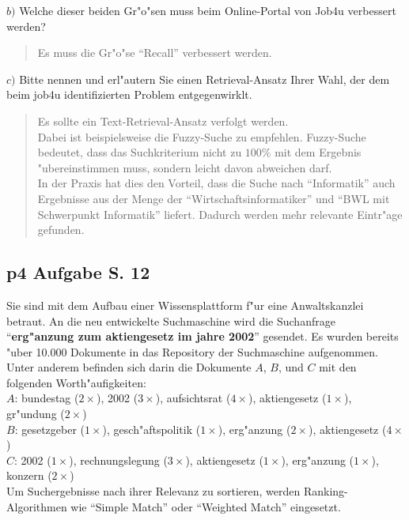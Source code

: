 \noindent
$b)$ Welche dieser beiden Gr"o"sen muss beim Online-Portal von Job4u verbessert werden?\\
\begin{quote}
    Es muss die Gr"o"se "`Recall"' verbessert werden.
\end{quote}

\noindent
$c)$ Bitte nennen und erl"autern Sie einen Retrieval-Ansatz Ihrer Wahl, der dem beim job4u identifizierten Problem entgegenwirklt.\\
\begin{quote}
    Es sollte ein Text-Retrieval-Ansatz verfolgt werden.\\
    Dabei ist beispielsweise die Fuzzy-Suche zu empfehlen.
    Fuzzy-Suche bedeutet, dass das Suchkriterium nicht zu $100\%$ mit dem Ergebnis "ubereinstimmen muss, sondern leicht davon abweichen darf.\\
    In der Praxis hat dies den Vorteil, dass die Suche nach "`Informatik"' auch Ergebnisse aus der Menge der "`Wirtschaftsinformatiker"' und "`BWL mit Schwerpunkt Informatik"' liefert. Dadurch werden mehr relevante Eintr"age gefunden.
\end{quote}


\subsection{p4 Aufgabe S. 12}
Sie sind mit dem Aufbau einer Wissensplattform f"ur eine Anwaltskanzlei betraut.
An die neu entwickelte Suchmaschine wird die Suchanfrage "`\textbf{erg"anzung zum aktiengesetz im jahre 2002}"' gesendet.
Es wurden bereits "uber  10.000 Dokumente in das Repository der Suchmaschine aufgenommen.
Unter anderem befinden sich darin die Dokumente $A$, $B$, und $C$ mit den folgenden Worth"aufigkeiten:\\

\noindent
$A$: bundestag ($2\times$), 2002 ($3\times$), aufsichtsrat ($4\times$), aktiengesetz ($1\times$), gr"undung ($2\times$)\\
$B$: gesetzgeber ($1\times$), gesch"aftspolitik ($1\times$), erg"anzung ($2\times$), aktiengesetz ($4\times$)\\
$C$: 2002 ($1\times$), rechnungslegung ($3\times$), aktiengesetz ($1\times$), erg"anzung ($1\times$), konzern ($2\times$)\\

\noindent
Um Suchergebnisse nach ihrer Relevanz zu sortieren, werden Ranking-Algorithmen wie "`Simple Match"' oder "`Weighted Match"' eingesetzt.\\


